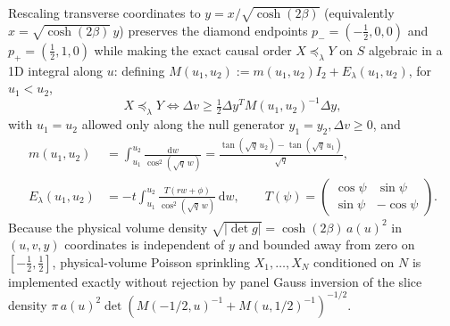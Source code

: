 \documentclass[11pt,a4paper]{article}
\newcommand{\dd}{\mathrm d}
\begin{document}
Rescaling transverse coordinates to $y = x/\sqrt{\cosh(2\beta)}$ (equivalently
$x = \sqrt{\cosh(2\beta)}\,y$) preserves the
diamond endpoints $p_- = (-\tfrac12, 0, 0)$ and $p_+ = (\tfrac12, 1, 0)$ while
making the exact causal order $X \preceq_\lambda Y$ on $S$ algebraic in a 1D
integral along $u$: defining $M(u_1,u_2) := m(u_1,u_2) I_2 + E_\lambda(u_1,u_2)$,
for $u_1 < u_2$,
\begin{equation}
 X \preceq_\lambda Y \iff \Delta v \ge \tfrac12 \Delta y^T
 M(u_1,u_2)^{-1} \Delta y,
 \label{eq:orderlaw}
\end{equation}
with $u_1 = u_2$ allowed only along the null generator $y_1 = y_2, \Delta v \ge 0$,
and
\begin{align}
 m(u_1,u_2) &= \int_{u_1}^{u_2} \frac{\dd w}{\cos^2(\sqrt{q}\,w)}
 = \frac{\tan(\sqrt{q}\,u_2)-\tan(\sqrt{q}\,u_1)}{\sqrt{q}}, \label{eq:mfunc}\\
 E_\lambda(u_1,u_2) &= -t \int_{u_1}^{u_2} \frac{T(r w + \phi)}{\cos^2(\sqrt{q}\,w)}\,\dd w,
 \qquad T(\psi) = \begin{pmatrix}\cos\psi & \sin\psi\\ \sin\psi & -\cos\psi\end{pmatrix}.
 \label{eq:Elam}
\end{align}
Because the physical volume density $\sqrt{|\det g|} = \cosh(2\beta)\,a(u)^2$ in $(u,v,y)$
coordinates is independent of $y$ and bounded away from zero on
$[-\tfrac12, \tfrac12]$, physical-volume Poisson sprinkling $X_1,\dots,X_N$
conditioned on $N$ is implemented exactly without rejection by panel Gauss
inversion of the slice density $\pi\,a(u)^2 \det(M(-1/2,u)^{-1} + M(u,1/2)^{-1})^{-1/2}$.
\end{document}
